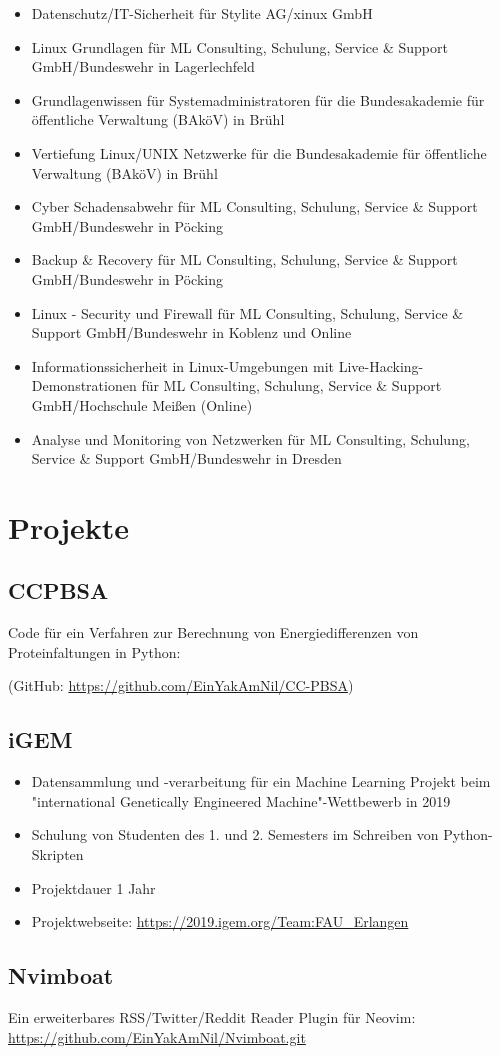 \documentclass{article}
\begin{document}
\begin{itemize}
\item Datenschutz/IT-Sicherheit für Stylite AG/xinux GmbH
\item Linux Grundlagen für ML Consulting, Schulung, Service \& Support GmbH/Bundeswehr in Lagerlechfeld
\item Grundlagenwissen für Systemadministratoren für die Bundesakademie für öffentliche Verwaltung (BAköV) in Brühl
\item Vertiefung Linux/UNIX Netzwerke für die Bundesakademie für öffentliche Verwaltung (BAköV) in Brühl
\item Cyber Schadensabwehr für ML Consulting, Schulung, Service \& Support GmbH/Bundeswehr in Pöcking
\item Backup \& Recovery für ML Consulting, Schulung, Service \& Support GmbH/Bundeswehr in Pöcking
\item Linux - Security und Firewall für ML Consulting, Schulung, Service \& Support GmbH/Bundeswehr in Koblenz und Online
\item Informationssicherheit in Linux-Umgebungen mit Live-Hacking-Demonstrationen für ML Consulting, Schulung, Service \& Support GmbH/Hochschule Meißen (Online)
\item Analyse und Monitoring von Netzwerken für ML Consulting, Schulung, Service \& Support GmbH/Bundeswehr in Dresden
\end{itemize}

\section{Projekte}

\subsection{CCPBSA}
Code für ein Verfahren zur Berechnung von Energiedifferenzen von Proteinfaltungen in Python:

(GitHub: \href{https://github.com/EinYakAmNil/CC-PBSA}{https://github.com/EinYakAmNil/CC-PBSA})

\subsection{iGEM}

\begin{itemize}
\item Datensammlung und -verarbeitung für ein Machine Learning Projekt beim "international Genetically Engineered Machine"-Wettbewerb in 2019
\item Schulung von Studenten des 1. und 2. Semesters im Schreiben von Python-Skripten
\item Projektdauer 1 Jahr
\item Projektwebseite: \href{https://2019.igem.org/Team:FAU_Erlangen}{https://2019.igem.org/Team:FAU\_Erlangen}
\end{itemize}

\subsection{Nvimboat}

Ein erweiterbares RSS/Twitter/Reddit Reader Plugin für Neovim: \href{https://github.com/EinYakAmNil/Nvimboat.git}{https://github.com/EinYakAmNil/Nvimboat.git}
\end{document}

